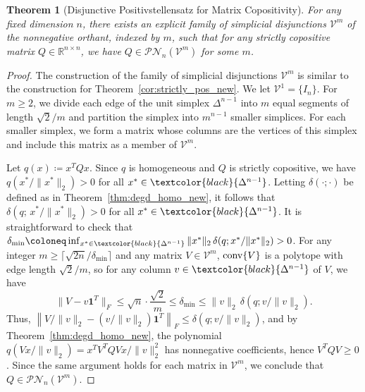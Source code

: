 \documentclass[12pt]{article}
\newcommand{\reals}{\mathbb{R}}
\newcommand{\defeq}{\coloneq}
\newcommand{\conv}{\operatornamewithlimits{conv}}
\newcommand{\mcV}{\mathcal{V}}
\newcommand{\mcPN}{\mathcal{PN}}
\newtheorem{theorem}{Theorem}%
\theoremstyle{remark}
\begin{document}

\begin{theorem}[Disjunctive Positivstellensatz for Matrix Copositivity]
\label{thm:psatz_copositive_full}
For any fixed dimension $n$, there exists an explicit family of simplicial disjunctions
$\mcV^m$ of the nonnegative orthant, indexed by $m$, such that for any strictly 
copositive matrix $Q \in \reals^{n \times n}$, we have $Q \in \mcPN_{n}(\mcV^m)$ 
for some $m$.
\end{theorem}
\begin{proof}
The construction of the family of simplicial disjunctions $\mcV^m$ is similar to the construction for Theorem~\ref{cor:strictly_pos_new}. We let $\mcV^1=\{I_n\}$. For $m\ge 2$, we divide each edge of the unit simplex $\Delta^{n-1}$ into $m$ equal segments of length $\sqrt{2}/m$ and partition the simplex into $m^{n-1}$ smaller simplices. For each smaller simplex, we form a matrix whose columns are the vertices of this simplex and include this matrix as a member of $\mcV^m$. 

Let $q(x)\defeq x^TQx$. 
Since $q$ is homogeneous and $Q$ is strictly copositive, we have $q(x^*/\|x^*\|_2) > 0$ for all $x^* \in \textcolor{black}{\Delta^{n-1}}$. Letting $\delta(\cdot;\cdot)$ be defined as in Theorem~\ref{thm:degd_homo_new}, it follows that $\delta(q;\, x^*/\|x^*\|_2) > 0$ for all
$x^* \in \textcolor{black}{\Delta^{n-1}}$. It is straightforward to check that $\delta_{\min}\defeq \inf_{x^* \in \textcolor{black}{\Delta^{n-1}}}
\|x^*\|_2\,\delta(q; x^*/\|x^*\|_2) > 0$. 
For any integer $m \geq \lceil\sqrt{2n}/\delta_{\min}\rceil$ and any matrix $V \in \mcV^m$, $\conv\{V\}$ is a polytope with edge length $\sqrt{2}/m$, so for any column $v \in \textcolor{black}{\Delta^{n-1}}$ of $V$, we have
\[
\|V - v\mathbf{1}^T\|_F \leq \sqrt{n} \cdot \frac{\sqrt{2}}{m} \leq \delta_{\min}
\leq \|v\|_2\,\delta(q; v/\|v\|_2).
\]
Thus, $\left\|V/\|v\|_2 - (v/\|v\|_2)\mathbf{1}^T\right\|_F \leq \delta(q; v/\|v\|_2)$, and by Theorem~\ref{thm:degd_homo_new}, the polynomial $q(V x/\|v\|_2) = x^TV^TQVx/\|v\|_2^2$ 
has nonnegative coefficients, hence $V^TQV \geq 0$.
Since the same argument holds for each matrix in $\mcV^m$, we conclude that 
$Q \in \mcPN_n(\mcV^m)$.
\end{proof}
\end{document}
